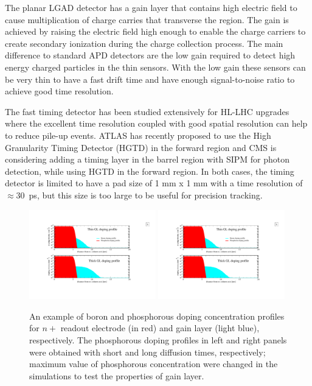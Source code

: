 \documentclass[aps,pt14,superscriptaddress,showpacs,floatfix,nofootinbib]{revtex4}
\begin{document}
The planar LGAD detector has a gain layer that contains high electric field to
cause multiplication of charge carries that transverse the region.
The gain is achieved by raising the electric field high enough to enable the
charge carriers to create secondary ionization during the charge collection process.
The main difference to standard APD detectors are the low gain
required to detect high energy charged particles in the thin sensors.
With the low gain these sensors can be very thin to have a fast drift time
and have enough signal-to-noise ratio to achieve good time resolution.

The fast timing detector has been studied extensively for HL-LHC upgrades where the
excellent time resolution coupled with good spatial resolution can help to
reduce pile-up events. ATLAS has recently proposed to use the High Granularity
Timing Detector (HGTD) in the forward region and CMS is considering adding
a timing layer in the barrel region with SIPM for photon detection, while using HGTD
in the forward region. In both cases, the timing detector is 
limited to have a pad size of 1 mm x 1 mm with a time resolution of $\approx$30~ps, but this 
size is too large to be useful for precision tracking.

\begin{figure}[hbtp]
\begin{center}
\includegraphics[width=0.49\textwidth,keepaspectratio]{figures1/ThinDopingProfile.pdf}
\includegraphics[width=0.49\textwidth,keepaspectratio]{figures1/ThickDopingProfile.pdf}
\caption{An example of boron and phosphorous doping concentration profiles for $n+$ readout electrode (in red) and gain layer (light blue), respectively. The phosphorous doping profiles in left and right panels were obtained with short and long diffusion times, respectively; maximum value of phosphorous concentration were changed in the simulations to test the properties of gain layer.\label{fig:DopingProfiles}} 
\end{center}
\end{figure}
\end{document}
